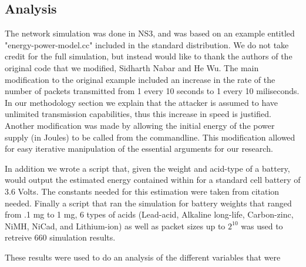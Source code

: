 \subsection{Analysis}
The network simulation was done in NS3, and was based on an example entitled "energy-power-model.cc" included in the standard distribution.
We do not take credit for the full simulation, but instead would like to thank the authors of the original code that we modified, 
Sidharth Nabar and He Wu. The main modification to the original example included an increase in the rate of the number of packets 
transmitted from 1 every 10 seconds to 1 every 10 miliseconds. In our methodology section we explain that the attacker is assumed to have
unlimited transmission capabilities, thus this increase in speed is justified. Another modification was made by allowing the initial energy
of the power supply (in Joules) to be called from the commandline. This modification allowed for easy iterative manipulation of the 
essential arguments for our research. 

In addition we wrote a script that, given the weight and acid-type of a battery, would output the estimated energy contained within for
a standard cell battery of 3.6 Volts. The constants needed for this estimation were taken from {citation needed}. Finally a script that 
ran the simulation for battery weights that ranged from .1 mg to 1 mg, 6 types of acids (Lead-acid, Alkaline long-life, Carbon-zinc, 
NiMH, NiCad, and Lithium-ion) as well as packet sizes up to $2^{10}$ was used to retreive 660 simulation results. 

These results were used to do an analysis of the different variables that were 
